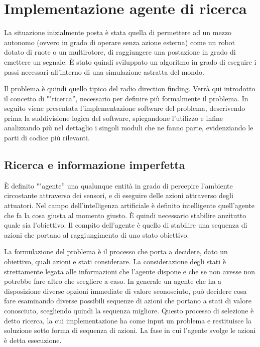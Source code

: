 \chapter{Implementazione agente di ricerca}
La situazione inizialmente posta è stata quella di permettere ad un mezzo autonomo (ovvero in grado di operare senza azione esterna) come un robot dotato di ruote o un multirotore, di raggiungere una postazione in grado di emettere un segnale. È stato quindi sviluppato un algoritmo in grado di eseguire i passi necessari all'interno di una simulazione astratta del mondo. 

Il problema è quindi quello tipico del radio direction finding. Verrà qui introdotto il concetto di ""ricerca'', necessario per definire più formalmente il problema. In seguito viene presentata l'implementazione software del problema, descrivendo prima la suddivisione logica del software, spiegandone l'utilizzo e infine analizzando più nel dettaglio i singoli moduli che ne fanno parte, evidenziando le parti di codice più rilevanti.

\section{Ricerca e informazione imperfetta}
È definito ""agente'' una qualunque entità in grado di percepire l'ambiente circostante attraverso dei sensori, e di eseguire delle azioni attraverso degli attuatori. Nel campo dell'intelligenza artificiale è definito intelligente quell'agente che fa la cosa giusta al momento giusto. È quindi necessario stabilire anzitutto quale sia l'obiettivo. Il compito dell'agente è quello di stabilire una sequenza di azioni che portano al raggiungimento di uno stato obiettivo. 

La formulazione del problema è il processo che porta a decidere, dato un obiettivo, quali azioni e stati considerare. La considerazione degli stati è strettamente legata alle informazioni che l'agente dispone e che se non avesse non potrebbe fare altro che scegliere a caso. In generale un agente che ha a disposizione diverse opzioni immediate di valore sconosciuto, può decidere cosa fare esaminando diverse possibili sequenze di azioni che portano a stati di valore conosciuto, scegliendo quindi la sequenza migliore. Questo processo di selezione è detto ricerca, la cui implementazione ha come input un problema e restituisce la soluzione sotto forma di sequenza di azioni. La fase in cui l'agente svolge le azioni è detta esecuzione.

